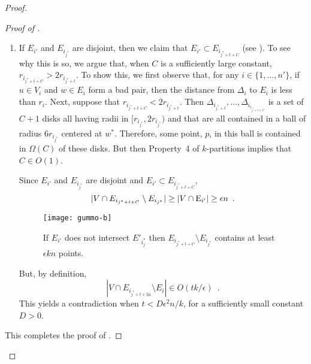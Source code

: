 \documentclass{patmorin}
\begin{document}
\begin{proof}
\begin{proof}[Proof of ]
\begin{enumerate}
    \item If $E_{i'}$ and $E_{i_{j^*}}$ are disjoint, then we claim that
    $E_{i'}\subset E_{i_{j^*+t+C}}$ (see ).  To see why
    this is so, we argue that, when $C$ is a sufficiently large constant,
    $r_{i_{j^*+t+C}} > 2r_{i_{j^*+t}}$.  To show this, we first observe
    that, for any $i\in\{1,\ldots,n'\}$, if $u\in V_i$ and $w\in E_i$
    form a bad pair, then the distance from $\Delta_i$ to $E_i$ is less
    than $r_i$.  Next, suppose that $r_{i_{j^*+t+C}} < 2r_{i_{j^*+t}}$.
    Then $\Delta_{i_{j^*+t}},\ldots,\Delta_{i_{i_{j^*+t+C}}}$ is a set
    of $C+1$ disks all having radii in $[r_{i_{j^*}},2r_{i_{j^*}})$ and
    that are all contained in a ball of radius $6r_{i_{j^*}}$ centered
    at $w^*$.  Therefore, some point, $p$, in this ball is contained in
    $\Omega(C)$ of these disks.  But then Property~4 of $k$-partitions
    implies that $C\in O(1)$.

    Since $E_{i'}$ and $E_{i_{j^*}}$ are disjoint and $E_{i'}\subset
    E_{i_{j^*+t+C}}$,
    \[
      |V\cap E_{i_{j^*+t+C}}\setminus E_{i_{j^*}}| 
         \ge |V\cap\mathrm{E}_{i'}| \ge \epsilon n \enspace .
    \]
    \begin{figure}
      \begin{center}
        \texttt{[image: gummo-b]}
        \caption{If $E_{i'}$ does not intersect $E'_{i_j^*}$ then
          $E_{i_{j^*+t+C}}\setminus E_{i_{j^*}}$ contains at least
          $\epsilon kn$ points.}
      \end{center}
    \end{figure}
    But, by definition, 
    \[
      |V\cap E_{i_{j^*+t+2\mu}}\setminus E_i| 
         \in O(tk/\epsilon) \enspace .
    \]
    This yields a contradiction when $t<D \epsilon^2 n/k$, for a
    sufficiently small constant $D>0$.
  \end{enumerate}
  This completes the proof of .
  \end{proof}



\end{proof}
\end{document}
